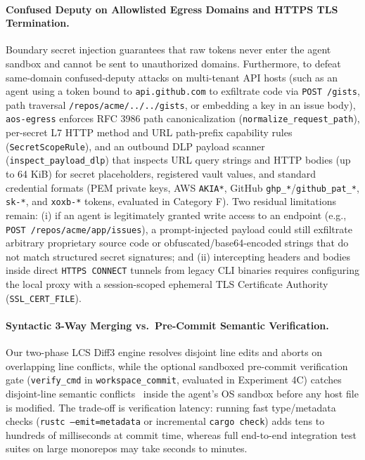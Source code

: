 \documentclass[10pt,twocolumn]{article}
\begin{document}
\paragraph{Confused Deputy on Allowlisted Egress Domains and HTTPS TLS Termination.} Boundary secret injection guarantees that raw tokens never enter the agent sandbox and cannot be sent to unauthorized domains. Furthermore, to defeat same-domain confused-deputy attacks on multi-tenant API hosts (such as an agent using a token bound to \texttt{api.github.com} to exfiltrate code via \texttt{POST /gists}, path traversal \texttt{/repos/acme/../../gists}, or embedding a key in an issue body), \texttt{aos-egress} enforces RFC 3986 path canonicalization (\texttt{normalize\_request\_path}), per-secret L7 HTTP method and URL path-prefix capability rules (\texttt{SecretScopeRule}), and an outbound DLP payload scanner (\texttt{inspect\_payload\_dlp}) that inspects URL query strings and HTTP bodies (up to 64 KiB) for secret placeholders, registered vault values, and standard credential formats (PEM private keys, AWS \texttt{AKIA*}, GitHub \texttt{ghp\_*}/\texttt{github\_pat\_*}, \texttt{sk-*}, and \texttt{xoxb-*} tokens, evaluated in Category F). Two residual limitations remain: (i) if an agent is legitimately granted write access to an endpoint (e.g., \texttt{POST /repos/acme/app/issues}), a prompt-injected payload could still exfiltrate arbitrary proprietary source code or obfuscated/base64-encoded strings that do not match structured secret signatures; and (ii) intercepting headers and bodies inside direct \texttt{HTTPS CONNECT} tunnels from legacy CLI binaries requires configuring the local proxy with a session-scoped ephemeral TLS Certificate Authority (\texttt{SSL\_CERT\_FILE}).

\paragraph{Syntactic 3-Way Merging vs.\ Pre-Commit Semantic Verification.} Our two-phase LCS Diff3 engine resolves disjoint line edits and aborts on overlapping line conflicts, while the optional sandboxed pre-commit verification gate (\texttt{verify\_cmd} in \texttt{workspace\_commit}, evaluated in Experiment 4C) catches disjoint-line semantic conflicts~\cite{apel2011semistructured} inside the agent's OS sandbox before any host file is modified. The trade-off is verification latency: running fast type/metadata checks (\texttt{rustc --emit=metadata} or incremental \texttt{cargo check}) adds tens to hundreds of milliseconds at commit time, whereas full end-to-end integration test suites on large monorepos may take seconds to minutes.
\end{document}
